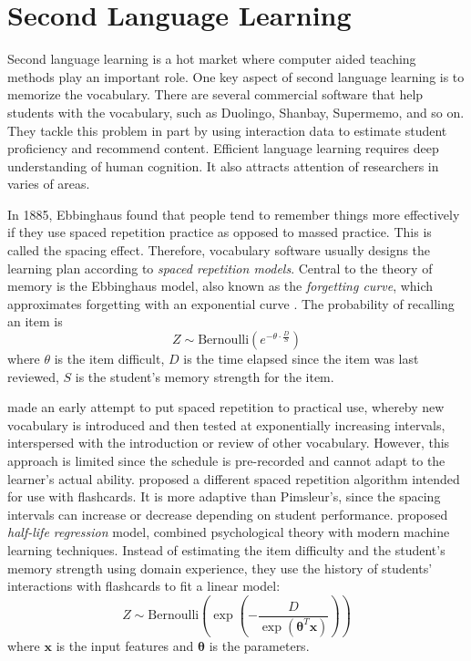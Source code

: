 \section{Second Language Learning}

    Second language learning is a hot market where computer aided teaching methods play an important role.
    One key aspect of second language learning is to memorize the vocabulary.
    There are several commercial software that help students with the vocabulary,
    such as Duolingo, Shanbay, Supermemo, and so on. 
    They tackle this problem in part by using interaction data to estimate student proficiency and recommend content.
    Efficient language learning requires deep understanding of human cognition.
    It also attracts attention of researchers in varies of areas.

    In 1885, Ebbinghaus found that people tend to remember things more effectively
    if they use spaced repetition practice as opposed to massed practice. \cite{ebbinghaus2013memory}
    This is called the spacing effect.
    Therefore, vocabulary software usually designs the learning plan according to \emph{spaced repetition models}.
    Central to the theory of memory is the Ebbinghaus model, also known as the \emph{forgetting curve},
    which approximates forgetting with an exponential curve \cite{bliss1993synaptic}.
    The probability of recalling an item is \cite{reddy2016unbounded}
    \[ Z \sim \mathrm{Bernoulli}\left( e^{-\theta\cdot\frac{D}{S}} \right) \]
    where $\theta$ is the item difficult,
    $D$ is the time elapsed since the item was last reviewed,
    $S$ is the student's memory strength for the item.

    \textcite{pimsleur1967memory} made an early attempt to put spaced repetition to practical use,
    whereby new vocabulary is introduced and then tested at exponentially increasing intervals,
    interspersed with the introduction or review of other vocabulary.
    However, this approach is limited since the schedule is pre-recorded and cannot adapt to the learner's actual ability.
    \textcite{leitner1972so} proposed a different spaced repetition algorithm intended for use with flashcards.
    It is more adaptive than Pimsleur's,
    since the spacing intervals can increase or decrease depending on student performance.
    \textcite{settles2016trainable} proposed \emph{half-life regression} model,
    combined psychological theory with modern machine learning techniques.
    Instead of estimating the item difficulty and the student's memory strength using domain experience,
    they use the history of students' interactions with flashcards to fit a linear model:
    \[ Z \sim \mathrm{Bernoulli}\left( \exp\left( -\frac{D}{\exp(\bm{\theta}^T\bm{x})} \right)\right) \]
    where $\bm{x}$ is the input features and $\bm{\theta}$ is the parameters.

